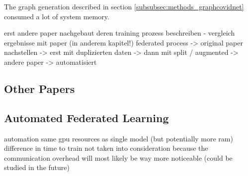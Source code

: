 The graph generation described in section \ref{subsubsec:methods_graphcovidnet} consumed a lot of system memory. 

erst andere paper nachgebaut
deren training prozess beschreiben - vergleich ergebnisse mit paper (in anderem kapitel!)
federated process 
  -> original paper nachstellen
  -> erst mit duplizierten daten
  -> dann mit split / augmented
  -> andere paper
  -> automatisiert


\subsection{Other Papers}


\subsection{Automated Federated Learning}
automation
same gpu resources as single model (but potentially more ram)
difference in time to train not taken into consideration because the communication overhead will most likely be way more noticeable (could be studied in the future)
